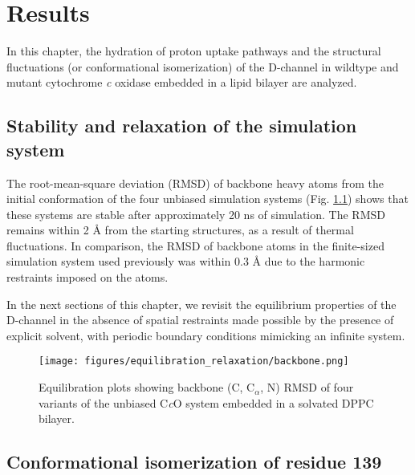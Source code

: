 \chapter{Results}

In this chapter, the hydration of proton uptake pathways and the structural fluctuations (or conformational isomerization) of the D-channel in wildtype and mutant cytochrome \emph{c} oxidase embedded in a lipid bilayer are analyzed.

\section{Stability and relaxation of the simulation system}
\label{sec:results-relaxation}

The root-mean-square deviation (RMSD) of backbone heavy atoms from the initial conformation of the four unbiased simulation systems (Fig. \ref{fig:equilibration_relaxation}) shows that these systems are stable after approximately 20 ns of simulation. The RMSD remains within 2 Å from the starting structures, as a result of thermal fluctuations. In comparison, the RMSD of backbone atoms in the finite-sized simulation system used previously was within 0.3 Å due to the harmonic restraints imposed on the atoms.

In the next sections of this chapter, we revisit the equilibrium properties of the D-channel in the absence of spatial restraints made possible by the presence of explicit solvent, with periodic boundary conditions mimicking an infinite system.

\begin{figure}[htbp]
\centering
\texttt{[image: figures/equilibration\_relaxation/backbone.png]}
\caption[Deviation from initial structure in molecular dynamics simulations of cytochrome \emph{c} oxidase.]{Equilibration plots showing backbone (C, C$_\alpha$, N) RMSD of four variants of the unbiased C\emph{c}O system embedded in a solvated DPPC bilayer.}
\label{fig:equilibration_relaxation}
\end{figure}

\section{Conformational isomerization of residue 139}
\label{sec:results-isomerization}

